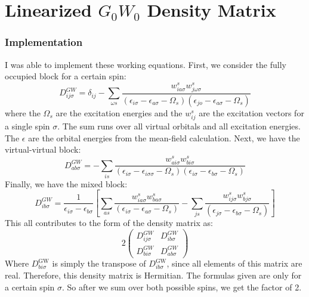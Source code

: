 \documentclass[12pt]{caltech_thesis}
\begin{document}
\chapter{Linearized $G_0W_0$ Density Matrix}
\subsection{Implementation}
I was able to implement these working equations. \autocite{bruneval_assessment_2019} First, we consider the fully occupied block for a certain spin:
\begin{equation}
D_{i j \sigma}^{G W}=\delta_{i j}-\sum_{\omega s} \frac{w_{i a \sigma}^s w_{j \omega \sigma}^s}{\left(\epsilon_{i \sigma}-\epsilon_{a \sigma}-\Omega_s\right)\left(\epsilon_{j o}-\epsilon_{a \sigma}-\Omega_s\right)}
\end{equation}
where the $\Omega_s$ are the excitation energies and the $w_{ij}^s$ are the excitation vectors for a single spin $\sigma$. The sum runs over all virtual orbitals and all excitation energies. The $\epsilon$ are the orbital energies from the mean-field calculation. Next, we have the virtual-virtual block:
\begin{equation}
D_{a b \sigma}^{G W}=-\sum_{i s} \frac{w_{a i \sigma}^s w_{b i \sigma}^s}{\left(\epsilon_{i \sigma}-\epsilon_{i \sigma \sigma}-\Omega_s\right)\left(\epsilon_{i \sigma}-\epsilon_{b \sigma}-\Omega_s\right)}
\end{equation}
Finally, we have the mixed block:
\begin{equation}
    D_{i b \sigma}^{G W}=\frac{1}{\epsilon_{i \sigma}-\epsilon_{b \sigma}}\left[ \sum_{as} \frac{w_{i a \sigma}^s w_{b a \sigma}^s}{\left(\epsilon_{i \sigma}-\epsilon_{a \sigma}-\Omega_s\right)} - \sum_{js} \frac{w_{i j \sigma}^s w_{b j \sigma}^s}{\left( \epsilon_{j \sigma}-\epsilon_{b \sigma}-\Omega_s\right)}\right]
\end{equation}
This all contributes to the form of the density matrix as:
\begin{equation}
    2\begin{pmatrix}
        D_{i j \sigma}^{G W} & D_{i b \sigma}^{G W} \\
        D_{bi \sigma}^{G W } & D_{a b \sigma}^{G W}
    \end{pmatrix}
\end{equation}
Where $D_{bi \sigma}^{\text{GW}}$ is simply the transpose of $D_{ib \sigma}^{\text{GW}}$, since all elements of this matrix are real. Therefore, this density matrix is Hermitian. The formulas given are only for a certain spin $\sigma$. So after we sum over both possible spins, we get the factor of 2.
\newpage
\end{document}
